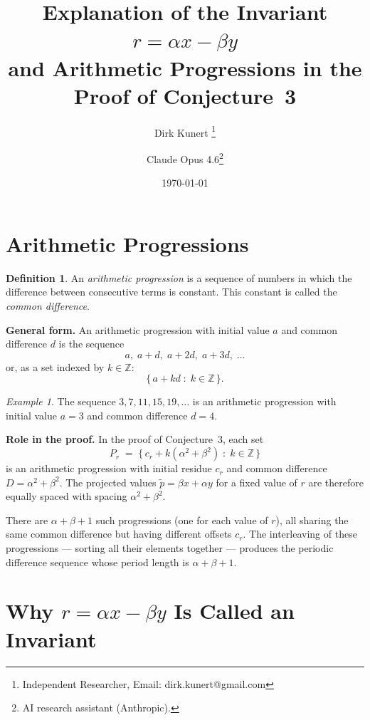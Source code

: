 \documentclass[11pt]{article}
\title{Explanation of the Invariant $r = \alpha x - \beta y$\\
\large and Arithmetic Progressions in the Proof of Conjecture~3}
\author{Dirk Kunert \thanks{Independent Researcher, Email: dirk.kunert@gmail.com}
\and
Claude Opus 4.6\thanks{AI research assistant (Anthropic).}}
\date{\today}
\theoremstyle{definition}
\newtheorem{definition}{Definition}
\theoremstyle{plain}
\theoremstyle{remark}
\newtheorem{example}{Example}
\begin{document}
\maketitle

\section{Arithmetic Progressions}

\begin{definition}
An \emph{arithmetic progression} is a sequence of numbers in which the
difference between consecutive terms is constant.  This constant is called
the \emph{common difference}.
\end{definition}

\noindent\textbf{General form.}
An arithmetic progression with initial value $a$ and common difference $d$ is
the sequence
\[
    a,\; a + d,\; a + 2d,\; a + 3d,\; \ldots
\]
or, as a set indexed by $k \in \mathbb{Z}$:
\[
    \{\, a + kd \;:\; k \in \mathbb{Z} \,\}.
\]

\begin{example}
The sequence $3, 7, 11, 15, 19, \ldots$ is an arithmetic progression with
initial value $a = 3$ and common difference $d = 4$.
\end{example}

\noindent\textbf{Role in the proof.}
In the proof of Conjecture~3, each set
\[
    P_r \;=\; \bigl\{\, c_r + k(\alpha^2 + \beta^2) \;:\; k \in \mathbb{Z} \,\bigr\}
\]
is an arithmetic progression with initial residue $c_r$ and common difference
$D = \alpha^2 + \beta^2$.  The projected values $\tilde{p} = \beta x + \alpha y$
for a fixed value of $r$ are therefore equally spaced with spacing
$\alpha^2 + \beta^2$.

There are $\alpha + \beta + 1$ such progressions (one for each value of $r$),
all sharing the same common difference but having different offsets $c_r$.
The interleaving of these progressions --- sorting all their elements together
--- produces the periodic difference sequence whose period length is
$\alpha + \beta + 1$.

\section{Why $r = \alpha x - \beta y$ Is Called an Invariant}
\end{document}
